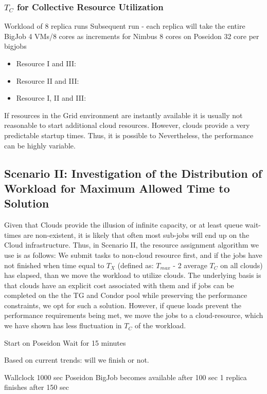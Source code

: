 \documentclass[conference,final]{IEEEtran}
\newcommand{\tmax}{$T_{max}$ }
\newcommand{\tc}{$T_{C}$ }
\begin{document}
\subsubsection{\tc for Collective Resource Utilization}

Workload of 8 replica runs
Subsequent run - each replica will take the entire BigJob
4 VMs/8 cores as increments for Nimbus
8 cores on Poseidon
32 core per bigjobs

\begin{itemize}
\item Resource I and III:
\item Resource II and III:
\item Resource I, II and III:
\end{itemize}


If resources in the Grid environment are instantly available it is usually not reasonable to start
additional cloud resources. However, clouds provide a very predictable startup times. Thus,
it is possible to  Nevertheless,
the performance can be highly variable.

\subsection{Scenario II: Investigation of the Distribution of Workload for Maximum Allowed
  Time to Solution} 

Given that Clouds provide the illusion of infinite capacity, or at
least queue wait-times are non-existent, it is likely that often most
sub-jobs will end up on the Cloud infrastructure.  Thus, in Scenario
II, the resource assignment algorithm we use is as follows: We submit
tasks to non-cloud resource first, and if the jobs have not finished
when time equal to $T_{X}$ (defined as: \tmax - 2 average \tc on all
clouds) has elapsed, than we move the workload to utilize clouds.  The
underlying basis is that clouds have an explicit cost associated with
them and if jobs can be completed on the the TG and Condor pool while
preserving the performance constraints, we opt for such a
solution. However, if queue loads prevent the performance requirements
being met, we move the jobs to a cloud-resource, which we have shown
has less fluctuation in \tc of the workload.

Start on Poseidon
Wait for 15 minutes

Based on current trends: will we finish or not.

Wallclock 1000 sec
Poseidon BigJob becomes available after 100 sec
1 replica finishes after 150 sec
\end{document}
